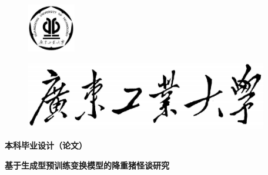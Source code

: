 {
		
\linespread{1.5}
\pagestyle{empty} %


\begin{figure}[h]
	\nonumber %
	\centering %
	\vspace{-0.2em} %
	\hspace*{-31em} %
	\includegraphics[width=2.09cm]{figures/校徽logo.jpg}
\end{figure}

\begin{figure}[h]
	\nonumber
	\centering
	\vspace{-1.8em}
	\hspace*{0em}
	\includegraphics[width=10.59cm]{figures/文字logo.jpg}
	\vspace{-1.8em}
\end{figure}

\begin{center}
	\hspace*{1em}
	\vspace{0em}
	\textbf{\boldheiti 本科毕业设计（论文）} %
	\vspace{0.7em}
\end{center}

\begin{center}
	\vspace{0.5em}
	\textbf{\boldheiti 基于生成型预训练变换模型的降重猪怪谈研究}
\end{center}

}
